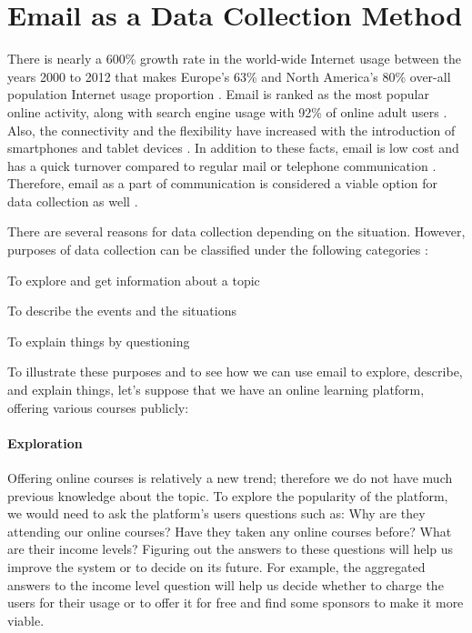 \section{Email as a Data Collection Method}
\label{sec:1:EmailDataCol}

There is nearly a 600\% growth rate in the world-wide Internet usage between the years 2000 to 2012 that makes Europe's 63\% and North America's 80\% over-all population Internet usage proportion \citep{InternetWorldStats2012}. Email is ranked as the most popular online activity, along with search engine usage with 92\% of online adult users \citep{Purcell2011}. Also, the connectivity and the flexibility have increased with the introduction of smartphones and tablet devices \citep{Madden2008}. In addition to these facts, email is low cost and has a quick turnover compared to regular mail or telephone communication \citep{Zikmund2007}. Therefore, email as a part of communication is considered a viable option for data collection as well \citep{Zikmund2007}.
\vspace{1cm}

There are several reasons for data collection depending on the situation. However, purposes of data collection can be classified under the following categories \citep{Sue2011} \citep[pages 92--94]{Babbie2010}:

\begin{compactenum}
	\item To explore and get information about a topic
	\item To describe the events and the situations
	\item To explain things by questioning
\end{compactenum}

To illustrate these purposes and to see how we can use email to explore, describe, and explain things, let's suppose that we have an online learning platform, offering various courses publicly:

\paragraph{Exploration}
Offering online courses is relatively a new trend; therefore we do not have much previous knowledge about the topic. To explore the popularity of the platform, we would need to ask the platform's users questions such as: Why are they attending our online courses? Have they taken any online courses before? What are their income levels? Figuring out the answers to these questions will help us improve the system or to decide on its future. For example, the aggregated answers to the income level question will help us decide whether to charge the users for their usage or to offer it for free and find some sponsors to make it more viable.

